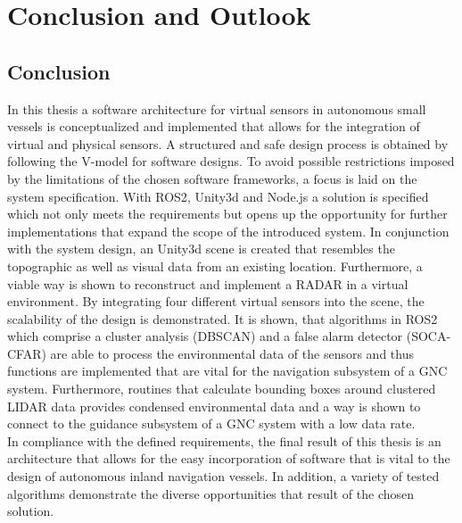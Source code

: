 
\chapter{Conclusion and Outlook}\label{ConFut}
 	\section{Conclusion} \label{Con}
    
    In this thesis a software architecture for virtual sensors in autonomous small vessels is conceptualized and implemented that allows for the integration of virtual and physical sensors.  A structured and safe design process is obtained by following the V-model for software designs. To avoid possible restrictions imposed by the limitations of the chosen software frameworks, a focus is laid on the system specification. With \ac{ROS2}, Unity3d and Node.js a solution is specified which not only meets the requirements but opens up the opportunity for further implementations that expand the scope of the introduced system. In conjunction with the system design, an Unity3d scene is created that resembles the topographic as well as visual data from an existing location. Furthermore, a viable way is shown to reconstruct and implement a \ac{RADAR} in a virtual environment. By integrating four different virtual sensors into the scene, the scalability of the design is demonstrated. It is shown, that algorithms in \ac{ROS2} which comprise a cluster analysis (\ac{DBSCAN}) and a false alarm detector (\ac{SOCA-CFAR}) are able to process the environmental data of the sensors and thus functions are implemented that are vital for the navigation subsystem of a \ac{GNC} system. Furthermore, routines that calculate bounding boxes around clustered \ac{LIDAR} data provides condensed environmental data and a way is shown to connect to the guidance subsystem of a \ac{GNC} system with a low data rate.\\
    
    In compliance with the defined requirements, the final result of this thesis is an architecture that allows for the easy incorporation of software that is vital to the design of autonomous inland navigation vessels. In addition, a variety of tested algorithms demonstrate the diverse opportunities that result of the chosen solution.
    
